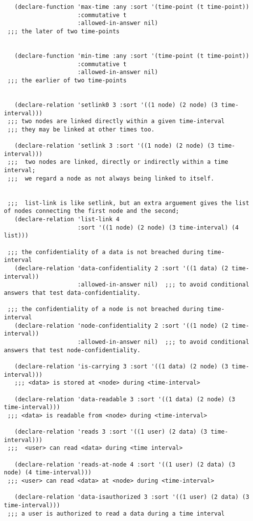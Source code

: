\begin{lstlisting}
   (declare-function 'max-time :any :sort '(time-point (t time-point))
                     :commutative t
                     :allowed-in-answer nil)
 ;;; the later of two time-points


   (declare-function 'min-time :any :sort '(time-point (t time-point))
                     :commutative t  
                     :allowed-in-answer nil)
 ;;; the earlier of two time-points


   (declare-relation 'setlink0 3 :sort '((1 node) (2 node) (3 time-interval)))
 ;;; two nodes are linked directly within a given time-interval
 ;;; they may be linked at other times too.

   (declare-relation 'setlink 3 :sort '((1 node) (2 node) (3 time-interval)))
 ;;;  two nodes are linked, directly or indirectly within a time interval;
 ;;;  we regard a node as not always being linked to itself.


 ;;;  list-link is like setlink, but an extra arguement gives the list of nodes connecting the first node and the second;
   (declare-relation 'list-link 4
                     :sort '((1 node) (2 node) (3 time-interval) (4 list)))
  
 ;;; the confidentiality of a data is not breached during time-interval
   (declare-relation 'data-confidentiality 2 :sort '((1 data) (2 time-interval))
                     :allowed-in-answer nil)  ;;; to avoid conditional answers that test data-confidentiality.

 ;;; the confidentiality of a node is not breached during time-interval
   (declare-relation 'node-confidentiality 2 :sort '((1 node) (2 time-interval))
                     :allowed-in-answer nil)  ;;; to avoid conditional answers that test node-confidentiality.

   (declare-relation 'is-carrying 3 :sort '((1 data) (2 node) (3 time-interval)))
   ;;; <data> is stored at <node> during <time-interval>

   (declare-relation 'data-readable 3 :sort '((1 data) (2 node) (3 time-interval)))
 ;;; <data> is readable from <node> during <time-interval>
  
   (declare-relation 'reads 3 :sort '((1 user) (2 data) (3 time-interval)))
 ;;;  <user> can read <data> during <time interval>

   (declare-relation 'reads-at-node 4 :sort '((1 user) (2 data) (3 node) (4 time-interval)))
 ;;; <user> can read <data> at <node> during <time-interval>

   (declare-relation 'data-isauthorized 3 :sort '((1 user) (2 data) (3 time-interval)))
 ;;; a user is authorized to read a data during a time interval


\end{lstlisting}
